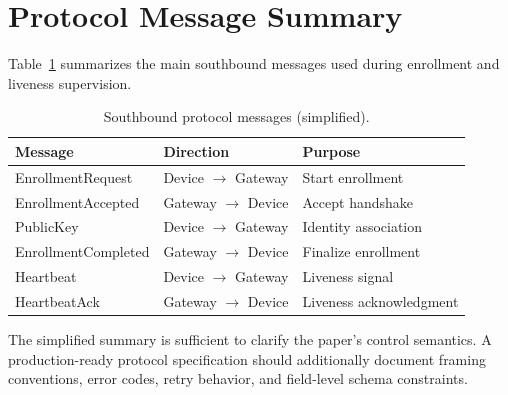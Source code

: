 \appendices

\section{Protocol Message Summary}
Table~\ref{tab:proto} summarizes the main southbound messages used during enrollment and liveness supervision.

\begin{table}[h]
\centering
\caption{Southbound protocol messages (simplified).}
\label{tab:proto}
\begin{tabular}{lll}
\toprule
\textbf{Message} & \textbf{Direction} & \textbf{Purpose} \\
\midrule
EnrollmentRequest & Device $\rightarrow$ Gateway & Start enrollment \\
EnrollmentAccepted & Gateway $\rightarrow$ Device & Accept handshake \\
PublicKey & Device $\rightarrow$ Gateway & Identity association \\
EnrollmentCompleted & Gateway $\rightarrow$ Device & Finalize enrollment \\
Heartbeat & Device $\rightarrow$ Gateway & Liveness signal \\
HeartbeatAck & Gateway $\rightarrow$ Device & Liveness acknowledgment \\
\bottomrule
\end{tabular}
\end{table}

The simplified summary is sufficient to clarify the paper's control semantics. A production-ready protocol specification should additionally document framing conventions, error codes, retry behavior, and field-level schema constraints.
